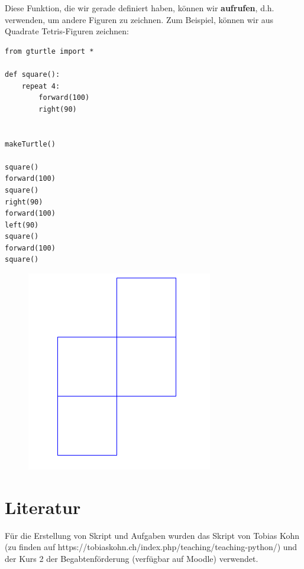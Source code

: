 \documentclass{article}
\begin{document}
Diese Funktion, die wir gerade definiert haben, können wir \textbf{aufrufen}, d.h. verwenden, um andere Figuren zu zeichnen.
Zum Beispiel, können wir aus Quadrate Tetris-Figuren zeichnen:
\begin{multicols}{2}
\begin{lstlisting}
from gturtle import *

def square():
    repeat 4:
        forward(100)
        right(90)
        

makeTurtle()

square()
forward(100)
square()
right(90)
forward(100)
left(90)
square()
forward(100)
square()
\end{lstlisting}
\columnbreak
\begin{figure}[H]
\centering
\includegraphics[width=\linewidth]{pictures/tetris.png}
\end{figure}
\end{multicols}



\section{Literatur}
Für die Erstellung von Skript und Aufgaben wurden das Skript von Tobias Kohn (zu finden auf https://tobiaskohn.ch/index.php/teaching/teaching-python/) und der Kurs 2 der Begabtenförderung (verfügbar auf Moodle) verwendet.
\end{document}
